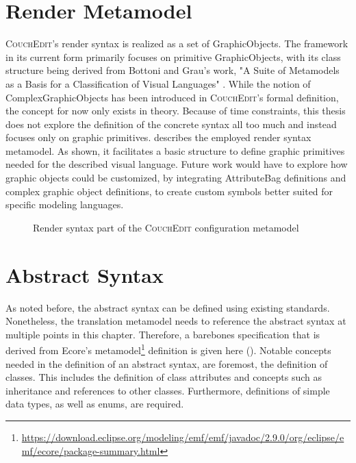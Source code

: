 \section{Render Metamodel}
\textsc{CouchEdit}'s render syntax is realized as a set of GraphicObjects. The framework in its current form primarily focuses on primitive GraphicObjects, with its class structure being derived from Bottoni and Grau's work, "A Suite of Metamodels as a Basis for a Classification of Visual Languages" \cite{nachreiner_couchedit_2020, bottoni_suite_2004}. While the notion of ComplexGraphicObjects has been introduced in \textsc{CouchEdit}'s formal definition, the concept for now only exists in theory. Because of time constraints, this thesis does not explore the definition of the concrete syntax all too much and instead focuses only on graphic primitives.  describes the employed render syntax metamodel. As shown, it facilitates a basic structure to define graphic primitives needed for the described visual language. Future work would have to explore how graphic objects could be customized, by integrating AttributeBag definitions and complex graphic object definitions, to create custom symbols better suited for specific modeling languages.

\begin{figure}[h]
  \centering
  
  \caption{Render syntax part of the \textsc{CouchEdit} configuration metamodel}
  \label{fig:concretesyntax}
\end{figure}


\section{Abstract Syntax}
\label{sec:abstract-syntax}
As noted before, the abstract syntax can be defined using existing standards. Nonetheless, the translation metamodel needs to reference the abstract syntax at multiple points in this chapter. Therefore, a barebones specification that is derived from Ecore's metamodel\footnote{\url{https://download.eclipse.org/modeling/emf/emf/javadoc/2.9.0/org/eclipse/emf/ecore/package-summary.html}} definition is given here (). Notable concepts needed in the definition of an abstract syntax, are foremost, the definition of classes. This includes the definition of class attributes and concepts such as inheritance and references to other classes. Furthermore, definitions of simple data types, as well as enums, are required.

